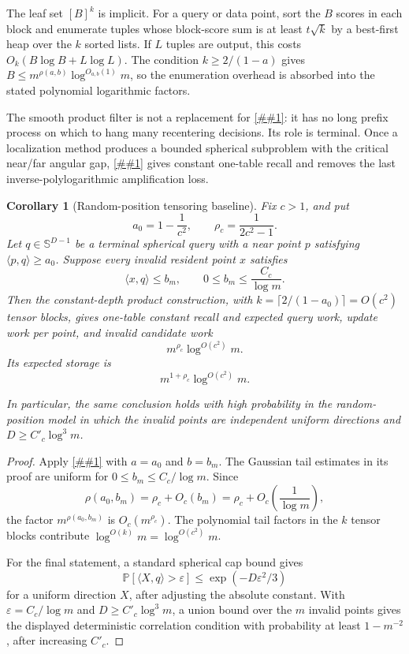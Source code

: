 \documentclass[10pt]{article}
\newcommand{\cref}[1]{\ref{##1}}
\newtheorem{corollary}[theorem]{Corollary}
\theoremstyle{definition}
\newcommand{\Prb}{\mathbb{P}}
\newcommand{\ip}[2]{\langle #1,#2\rangle}
\begin{document}
The leaf set $[B]^k$ is implicit. For a query or data point, sort the $B$ scores in each block and enumerate tuples whose block-score sum is at least $t\sqrt k$ by a best-first heap over the $k$ sorted lists. If $L$ tuples are output, this costs $O_k(B\log B+L\log L)$. The condition $k\ge2/(1-a)$ gives $B\le m^{\rho(a,b)}\log^{O_{a,b}(1)}m$, so the enumeration overhead is absorbed into the stated polynomial logarithmic factors.

The smooth product filter is not a replacement for \cref{lem:adaptive-continuation}: it has no long prefix process on which to hang many recentering decisions. Its role is terminal. Once a localization method produces a bounded spherical subproblem with the critical near/far angular gap, \cref{thm:smooth-product-terminal} gives constant one-table recall and removes the last inverse-polylogarithmic amplification loss.

\begin{corollary}[Random-position tensoring baseline]\label{cor:random-position-tensoring}
   Fix \(c>1\), and put
   \[
      a_0=1-\frac1{c^2},
      \qquad
      \rho_c=\frac1{2c^2-1}.
   \]
   Let \(q\in\mathbb S^{D-1}\) be a terminal spherical query with a near point
   \(p\) satisfying \(\ip{p}{q}\ge a_0\).  Suppose every invalid resident point
   \(x\) satisfies
   \[
      \ip{x}{q}\le b_m,
      \qquad
      0\le b_m\le\frac{C_c}{\log m}.
   \]
   Then the constant-depth product construction, with
   \(k=\lceil 2/(1-a_0)\rceil=O(c^2)\) tensor blocks, gives one-table constant
   recall and expected query work, update work per point, and invalid
   candidate work
   \[
      m^{\rho_c}\log^{O(c^2)}m .
   \]
   Its expected storage is
   \[
      m^{1+\rho_c}\log^{O(c^2)}m .
   \]

   In particular, the same conclusion holds with high probability in the
   random-position model in which the invalid points are independent uniform
   directions and \(D\ge C'_c\log^3 m\).
\end{corollary}

\begin{proof}
   Apply \cref{thm:smooth-product-terminal} with \(a=a_0\) and \(b=b_m\).
   The Gaussian tail estimates in its proof are uniform for
   \(0\le b_m\le C_c/\log m\).  Since
   \[
      \rho(a_0,b_m)=\rho_c+O_c(b_m)
      =
      \rho_c+O_c\!\left(\frac1{\log m}\right),
   \]
   the factor \(m^{\rho(a_0,b_m)}\) is \(O_c(m^{\rho_c})\).  The polynomial
   tail factors in the \(k\) tensor blocks contribute
   \(\log^{O(k)}m=\log^{O(c^2)}m\).

   For the final statement, a standard spherical cap bound gives
   \[
      \Prb[\ip{X}{q}>\varepsilon]\le \exp(-D\varepsilon^2/3)
   \]
   for a uniform direction \(X\), after adjusting the absolute constant.  With
   \(\varepsilon=C_c/\log m\) and \(D\ge C'_c\log^3 m\), a union bound over the
   \(m\) invalid points gives the displayed deterministic correlation
   condition with probability at least \(1-m^{-2}\), after increasing \(C'_c\).
\end{proof}
\end{document}
